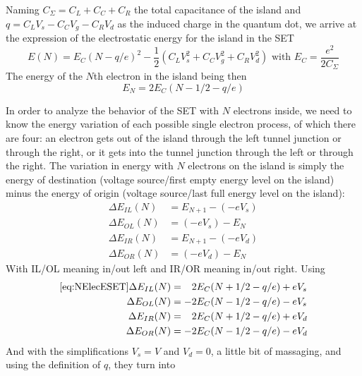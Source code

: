 \documentclass[../main.tex]{subfiles}
\begin{document}
Naming \(C_{\Sigma} = C_{L} + C_{C} + C_{R}\) the total capacitance of the
island and \(q = C_{L}V_{s} - C_{C}V_{g} - C_{R}V_{d}\) as the induced charge
in the quantum dot, we arrive at the expression of the electrostatic energy
for the island in the SET
\begin{equation*}
\label{eq:ElecESET}
    E(N) = E_{C}(N - q/e)^2
             - \frac{1}{2}\left(C_{L}V_{s}^2 + C_{C}V_{g}^2 + C_{R}V_{d}^2\right)
             \text{ with } E_{C} = \frac{e^2}{2 C_{\Sigma}}
\end{equation*}
The energy of the \(N\)th electron in the island being then
\begin{equation}
\label{eq:NElecESET}
    E_{N} = 2E_{C}(N - 1/2 - q/e)
\end{equation}

In order to analyze the behavior of the SET with \(N\) electrons inside, we
need to know the energy variation of each possible single electron process,
of which there are four: an electron gets out of the island through the
left tunnel junction or through the right, or it gets into the tunnel junction
through the left or through the right. The variation in energy with \(N\)
electrons on the island is simply the energy of destination (voltage
source/first empty energy level on the island) minus the energy of origin
(voltage source/last full energy level on the island):
\begin{align*}
    \Delta E_{IL}(N) &= E_{N+1} - (-eV_{s})\\
    \Delta E_{OL}(N) &= (-eV_{s}) - E_{N}\\
    \Delta E_{IR}(N) &= E_{N + 1} - (-eV_{d})\\
    \Delta E_{OR}(N) &= (-eV_{d}) - E_{N}
\end{align*}
With IL/OL meaning in/out left and IR/OR meaning in/out right. Using
\begin{align}
\ref{eq:NElecESET}
    \Delta E_{IL}(N) &= \phantom{-}2E_{C}(N + 1/2 - q/e) + eV_{s}\\
    \Delta E_{OL}(N) &= -2E_{C}(N - 1/2 - q/e) - eV_{s}\\
    \Delta E_{IR}(N) &= \phantom{-}2E_{C}(N + 1/2 - q/e) + eV_{d}\\
    \Delta E_{OR}(N) &= -2E_{C}(N - 1/2 - q/e) - eV_{d}
\end{align}
And with the simplifications \(V_{s} =  V\) and \(V_{d} = 0\), a little
bit of massaging, and using the definition of \(q\), they turn into
\end{document}
